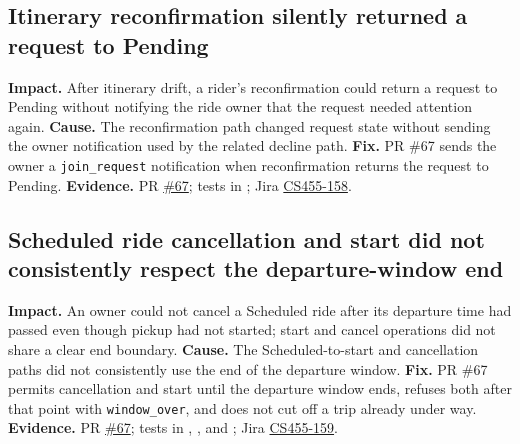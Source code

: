 \documentclass[10pt]{article}
\begin{document}
\subsection{Itinerary reconfirmation silently returned a request to Pending}
\textbf{Impact.} After itinerary drift, a rider's reconfirmation could return a request to Pending without notifying the ride owner that the request needed attention again.
\textbf{Cause.} The reconfirmation path changed request state without sending the owner notification used by the related decline path.
\textbf{Fix.} PR \#67 sends the owner a \texttt{join\_request} notification when reconfirmation returns the request to Pending.
\textbf{Evidence.} PR \href{https://github.com/CS455-Carpooling/Campus_Ridepooling_Automation/pull/67}{\#67}; tests in ; Jira \href{https://cs455project.atlassian.net/browse/CS455-158}{CS455-158}.

\subsection{Scheduled ride cancellation and start did not consistently respect the departure-window end}
\textbf{Impact.} An owner could not cancel a Scheduled ride after its departure time had passed even though pickup had not started; start and cancel operations did not share a clear end boundary.
\textbf{Cause.} The Scheduled-to-start and cancellation paths did not consistently use the end of the departure window.
\textbf{Fix.} PR \#67 permits cancellation and start until the departure window ends, refuses both after that point with \texttt{window\_over}, and does not cut off a trip already under way.
\textbf{Evidence.} PR \href{https://github.com/CS455-Carpooling/Campus_Ridepooling_Automation/pull/67}{\#67}; tests in , , and ; Jira \href{https://cs455project.atlassian.net/browse/CS455-159}{CS455-159}.
\end{document}
